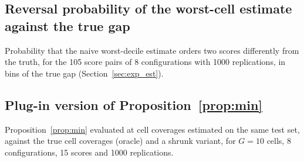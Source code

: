 \subsection{Reversal probability of the worst-cell estimate against the true gap}\label{app:c15}
Probability that the naive worst-decile estimate orders two scores differently from the truth, for the 105 score pairs of 8 configurations with 1000 replications, in bins of the true gap (Section~\ref{sec:exp_est}).
\begin{table}[!ht]
  \centering
  \caption{Probability that the estimated worst $x_0$-decile coverage orders two scores differently from the true order, against the true gap, with 95\% intervals (bootstrap over configurations), for one replication and for the mean of 25 replications at $n_{\mathrm{te}}=500,2000,10^4$. Last row: smallest gap from which the probability is at most $0.05$. Source: \texttt{A3\_flip\_bins.csv}, \texttt{A3\_flip\_threshold.csv}; \texttt{tables/tab\_c15\_flip.py}.}
  \label{tab:c15}
  \scriptsize
  
\end{table}

\FloatBarrier
\subsection{Plug-in version of Proposition~\ref{prop:min}}\label{app:c13}
Proposition~\ref{prop:min} evaluated at cell coverages estimated on the same test set, against the true cell coverages (oracle) and a shrunk variant, for $G=10$ cells, 8 configurations, 15 scores and 1000 replications.
\begin{table}[!ht]
  \centering
  \caption{Observed bias of the naive worst-cell estimate, bias predicted by the formula at the true cell coverages (oracle), at estimated ones (plug-in) and at shrunk ones, RMSE of the naive estimate and of the estimate corrected by the plug-in and shrunk bias, correlation $r$ across scores between the observed and the plug-in bias, and single-replication Kendall $\tau$ with the true ranking for the naive and the plug-in-corrected estimate. Source: \texttt{A3pi\_summary.csv}, \texttt{A3pi\_rank.csv}; \texttt{tables/tab\_c13\_plugin.py}.}
  \label{tab:c13}
  \scriptsize
  
\end{table}

\clearpage
